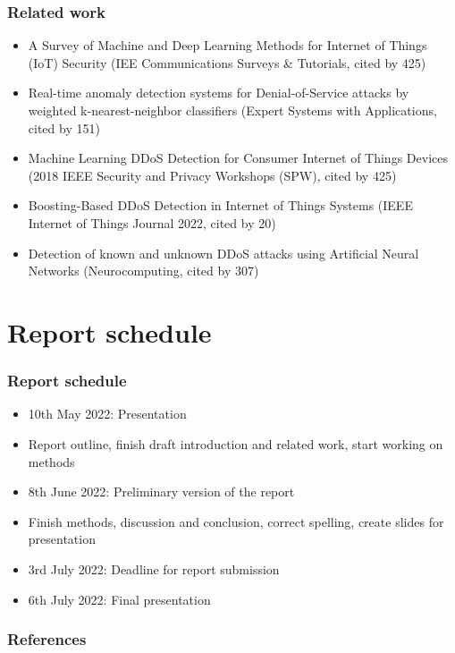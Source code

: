 \documentclass[10pt, presentation]{beamer}
\begin{document}
\begin{frame}
\frametitle{Related work}
  \begin{itemize}
    \item A Survey of Machine and Deep Learning Methods for Internet of Things (IoT) Security (IEE Communications Surveys \& Tutorials, cited by 425)
    \item Real-time anomaly detection systems for Denial-of-Service attacks by weighted k-nearest-neighbor classifiers (Expert Systems with Applications, cited by 151)
    \item Machine Learning DDoS Detection for Consumer Internet of Things Devices (2018 IEEE Security and Privacy Workshops (SPW), cited by 425)
    \item Boosting-Based DDoS Detection in Internet of Things Systems (IEEE Internet of Things Journal 2022, cited by 20)
    \item Detection of known and unknown DDoS attacks using Artificial Neural Networks (Neurocomputing, cited by 307)
  \end{itemize}
\end{frame}


\section{Report schedule}
\begin{frame}
\frametitle{Report schedule}
  \begin{itemize}
    \item 10th May 2022: Presentation
    \item Report outline, finish draft introduction and related work, start working on methods
    \item 8th June 2022: Preliminary version of the report
    \item Finish methods, discussion and conclusion, correct spelling, create slides for presentation
    \item 3rd July 2022: Deadline for report submission
    \item 6th July 2022: Final presentation
  \end{itemize}
\end{frame}


    \begin{frame}
        \frametitle{References}
        \printbibliography
    \end{frame}
\end{document}
